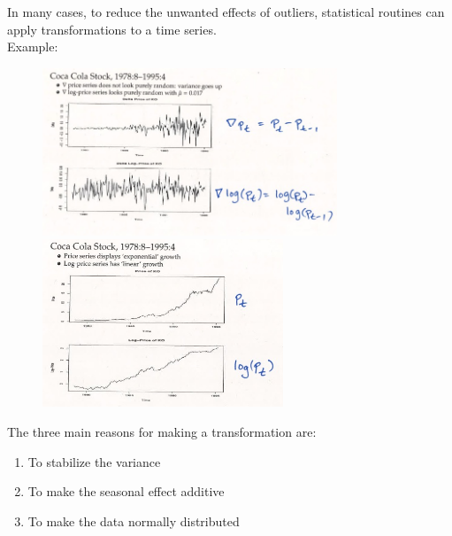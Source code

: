 In many cases, to reduce the unwanted effects of outliers, statistical routines can apply transformations to a time series.\\

Example:

\begin{figure}[H]
  \centering
  \begin{minipage}{0.49\textwidth}
    \includegraphics[height=5cm]{images/Screenshot 2024-03-30 at 17.45.04.jpg} %
  \end{minipage}\hfill
  \begin{minipage}{0.49\textwidth}
    \includegraphics[height=5cm]{images/Screenshot 2024-03-30 at 17.46.58.jpg} %
  \end{minipage}
\end{figure}

The three main reasons for making a transformation are:
\begin{enumerate}[label=(\roman*)]
    \item To stabilize the variance
    \item To make the seasonal effect additive
    \item To make the data normally distributed
\end{enumerate}

